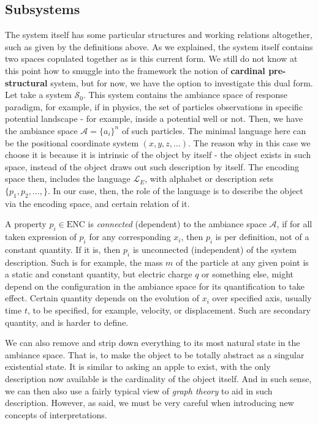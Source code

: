 \subsection{Subsystems}

The system itself has some particular structures and working relations altogether, such as given by the definitions above. As we explained, the system itself contains two spaces copulated together as is this current form. We still do not know at this point how to smuggle into the framework the notion of \textbf{cardinal pre-structural} system, but for now, we have the option to investigate this dual form. Let take a system $\mathcal{S}_{0}$. This system contains the ambiance space of response paradigm, for example, if in physics, the set of particles observations in specific potential landscape - for example, inside a potential well or not. Then, we have the ambiance space $\mathcal{A}=\{a_{i}\}^{n}$ of such particles. The minimal language here can be the positional coordinate system $(x,y,z,\dots)$. The reason why in this case we choose it is because it is intrinsic of the object by itself - the object exists in such space, instead of the object draws out such description by itself. The encoding space then, includes the language $\mathcal{L}_{E}$, with alphabet or description sets $\{p_{1},p_{2},\dots,\}$. In our case, then, the role of the language is to describe the object via the encoding space, and certain relation of it. 

A property $p_{i}\in \mathrm{ENC}$ is \textit{connected} (dependent) to the ambiance space $\mathcal{A}$, if for all taken expression of $p_{i}$ for any corresponding $x_{i}$, then $p_{i}$ is per definition, not of a constant quantity. If it is, then $p_{i}$ is unconnected (independent) of the system description. Such is for example, the mass $m$ of the particle at any given point is a static and constant quantity, but electric charge $q$ or something else, might depend on the configuration in the ambiance space for its quantification to take effect. Certain quantity depends on the evolution of $x_{i}$ over specified axis, usually time $t$, to be specified, for example, velocity, or displacement. Such are secondary quantity, and is harder to define. 

We can also remove and strip down everything to its most natural state in the ambiance space. That is, to make the object to be totally abstract as a singular existential state. It is similar to asking an apple to exist, with the only description now available is the cardinality of the object itself. And in such sense, we can then also use a fairly typical view of \textit{graph theory} to aid in such description. However, as said, we must be very careful when introducing new concepts of interpretations. 

